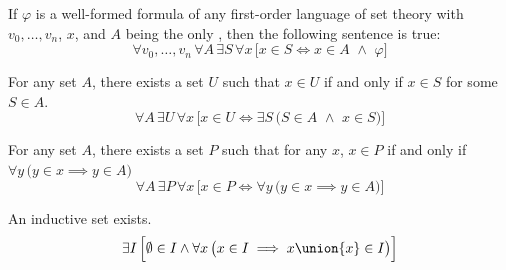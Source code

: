 \begin{axm}
    \label{axm:axiom-schema-of-specification}
    If \( \varphi \) is a well-formed formula of any first-order language of set theory with \( v_{0},\dots, v_{n}\), \( x \), and \( A \)
    being the only , then the following sentence is true:
    \begin{equation*}
        \forall v_{0},\dots,v_{n} \, \forall A \, \exists S \, \forall x \, \Big[ x \in S \iff x \in A \,\,{\land}\,\, \varphi \Big]
    \end{equation*}
\end{axm}

\begin{axm}
    \label{axm:axiom-of-union}
    For any set \( A \), there exists a set \( U \) such that \( x \in U \) if and only if \( x \in S \) for some \( S \in A \).
    \begin{equation*}
        \forall A \, \exists U \, \forall x \, \Big[ x \in U \iff \exists S \, \big( S \in A \,\,{\land}\,\, x \in S \big) \Big]
    \end{equation*}
\end{axm}

\begin{axm}
    \label{axm:axiom-of-power-set}
    For any set \( A \), there exists a set \( P \) such that for any \( x \), \( x \in P \) if and only if \,\( \forall y \, \bigl( y \in x \implies y \in A \bigr) \)
    \begin{equation*}
        \forall A \, \exists P \, \forall x \, \Big[ x \in P \iff \forall y \, \big( y \in x \implies y \in A \big)\Big]
    \end{equation*}
\end{axm}

\begin{axm}
    \label{axm:axiom-of-infinity}
    An inductive set exists.
    \begin{equation*}
        \exists I \, \Big[ \emptyset \in I \land \forall x \, \big( x \in I \implies x \union \{x\} \in I\big)\Big]
    \end{equation*}
\end{axm}
